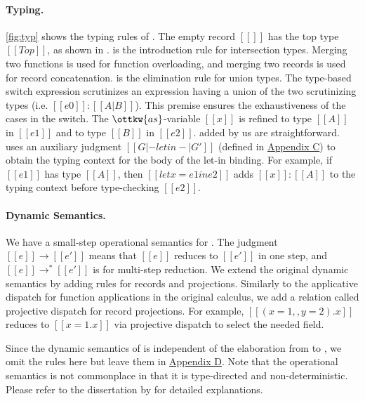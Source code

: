 \paragraph{Typing.}
\autoref{fig:typ} shows the typing rules of \lambdaiu. The empty record $[[{}]]$
has the top type $[[Top]]$, as shown in .  is the
introduction rule for intersection types. Merging two functions is used for
function overloading, and merging two records is used for record concatenation.
 is the elimination rule for union types. The type-based switch
expression scrutinizes an expression having a union of the two scrutinizing
types (i.e. $[[e0]]:[[A|B]]$). This premise ensures the exhaustiveness of the
cases in the switch. The $\ottkw{as}$-variable $[[x]]$ is refined to type
$[[A]]$ in $[[e1]]$ and to type $[[B]]$ in $[[e2]]$.
 added by us are straightforward. 
uses an auxiliary judgment $[[G |- letin -| G']]$ (defined in
\hyperref[sec:appendix-let]{Appendix C}) to obtain the typing context for the
body of the let-in binding. For example, if $[[e1]]$ has type $[[A]]$, then
$[[let x = e1 in e2]]$ adds $[[x]]:[[A]]$ to the typing context before
type-checking $[[e2]]$.

\paragraph{Dynamic Semantics.}
We have a small-step operational semantics for \lambdaiu. The judgment
$[[e]]\longrightarrow[[e']]$ means that $[[e]]$ reduces to $[[e']]$ in one step,
and $[[e]]\longrightarrow^*[[e']]$ is for multi-step reduction. We extend the
original dynamic semantics by adding rules for records and projections.
Similarly to the applicative dispatch for function applications in the original
calculus, we add a relation called projective dispatch for record projections.
For example, $[[({x = 1},,{y = 2}).x]]$ reduces to $[[{x = 1}.x]]$ via
projective dispatch to select the needed field.

Since the dynamic semantics of \lambdaiu is independent of the elaboration from
\uaena to \lambdaiu, we omit the rules here but leave them in
\hyperref[sec:appendix-dynamics]{Appendix D}. Note that the operational
semantics is not commonplace in that it is type-directed and non-deterministic.
Please refer to the dissertation by \citet{rehman2023blend} for detailed
explanations.

